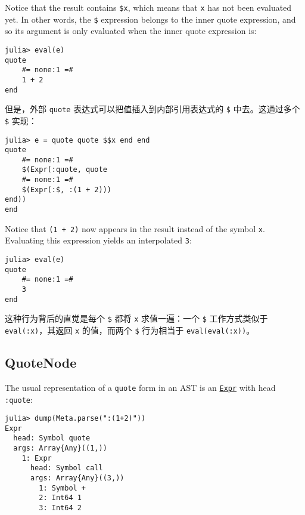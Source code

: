 Notice that the result contains \texttt{\$x}, which means that \texttt{x} has not been evaluated yet. In other words, the \texttt{\$} expression {\textquotedbl}belongs to{\textquotedbl} the inner quote expression, and so its argument is only evaluated when the inner quote expression is:




\begin{verbatim}
julia> eval(e)
quote
    #= none:1 =#
    1 + 2
end
\end{verbatim}



但是，外部 \texttt{quote} 表达式可以把值插入到内部引用表达式的 \texttt{\$} 中去。这通过多个 \texttt{\$} 实现：




\begin{verbatim}
julia> e = quote quote $$x end end
quote
    #= none:1 =#
    $(Expr(:quote, quote
    #= none:1 =#
    $(Expr(:$, :(1 + 2)))
end))
end
\end{verbatim}



Notice that \texttt{(1 + 2)} now appears in the result instead of the symbol \texttt{x}. Evaluating this expression yields an interpolated \texttt{3}:




\begin{verbatim}
julia> eval(e)
quote
    #= none:1 =#
    3
end
\end{verbatim}



这种行为背后的直觉是每个 \texttt{\$} 都将 \texttt{x} 求值一遍：一个 \texttt{\$} 工作方式类似于 \texttt{eval(:x)}，其返回 \texttt{x} 的值，而两个 \texttt{\$} 行为相当于 \texttt{eval(eval(:x))}。



\hypertarget{15194695339988120385}{}


\subsection{QuoteNode}



The usual representation of a \texttt{quote} form in an AST is an \hyperlink{17120496304147995299}{\texttt{Expr}} with head \texttt{:quote}:




\begin{verbatim}
julia> dump(Meta.parse(":(1+2)"))
Expr
  head: Symbol quote
  args: Array{Any}((1,))
    1: Expr
      head: Symbol call
      args: Array{Any}((3,))
        1: Symbol +
        2: Int64 1
        3: Int64 2
\end{verbatim}




